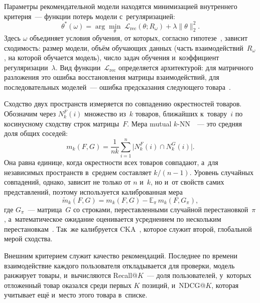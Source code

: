 \documentclass[a4paper,12pt]{article}
\begin{document}
Параметры рекомендательной модели находятся минимизацией внутреннего критерия~---
функции потерь модели с~регуляризацией:
\begin{equation}\label{eq:train}
  \theta^{*}(\omega)=\arg\min_{\theta}\;\mathcal{L}_{\mathrm{rec}}(\theta;R_\omega)
  +\lambda\|\theta\|_2^2.
\end{equation}
Здесь $\omega$ объединяет условия обучения, от которых, согласно
гипотезе~\cite{huh2024platonic}, зависит сходимость: размер модели, объём обучающих
данных (часть взаимодействий~$R_\omega$, на которой обучается модель), число задач
обучения и~коэффициент регуляризации~$\lambda$. Вид функции~$\mathcal{L}_{\mathrm{rec}}$
определяется архитектурой: для матричного разложения это ошибка восстановления матрицы
взаимодействий, для последовательных моделей~--- ошибка предсказания следующего
товара~\cite{kang2018sasrec}.

Сходство двух пространств измеряется по совпадению окрестностей товаров. Обозначим
через $N_k^F(i)$ множество из~$k$ товаров, ближайших к~товару~$i$ по косинусному
сходству строк матрицы~$F$. Мера mutual $k$-NN~\cite{huh2024platonic}~--- это средняя
доля общих соседей:
\begin{equation}\label{eq:mknn}
  m_k(F,G)=\frac{1}{nk}\sum_{i=1}^{n}\bigl|N_k^F(i)\cap N_k^G(i)\bigr|.
\end{equation}
Она равна единице, когда окрестности всех товаров совпадают, а~для независимых
пространств в~среднем составляет $k/(n-1)$. Уровень случайных совпадений, однако,
зависит не только от $n$ и~$k$, но и~от свойств самих представлений, поэтому
используется калиброванная мера
\begin{equation}\label{eq:calib}
  \tilde m_k(F,G)=m_k(F,G)-\mathbb{E}_{\pi}\,m_k(F,G_{\pi}),
\end{equation}
где $G_\pi$~--- матрица~$G$ со строками, переставленными случайной перестановкой~$\pi$,
а~математическое ожидание оценивается усреднением по нескольким
перестановкам~\cite{groger2026aristotelian}. Так~же калибруется CKA~\cite{kornblith2019cka},
которое служит второй, глобальной мерой сходства.

Внешним критерием служит качество рекомендаций. Последнее по времени взаимодействие
каждого пользователя откладывается для проверки, модель ранжирует товары, и~вычисляются
Recall@$K$~--- доля пользователей, у~которых отложенный товар оказался среди первых $K$
позиций, и~NDCG@$K$, которая учитывает ещё и~место этого товара в~списке.
\end{document}
